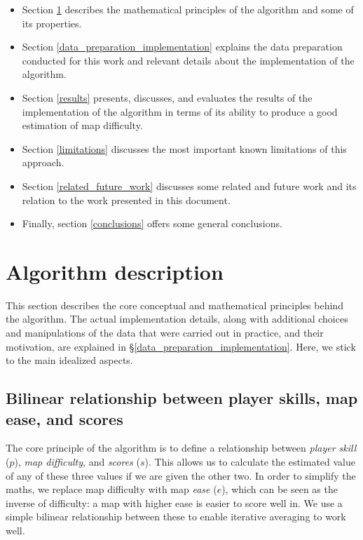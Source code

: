 \documentclass[12pt,a4paper]{article}
\begin{document}
\begin{itemize}

\item Section \ref{algorithm_description} describes the mathematical principles of the algorithm and some of its properties.
\item Section \ref{data_preparation_implementation} explains the data preparation conducted for this work and relevant details about the implementation of the algorithm.
\item Section \ref{results} presents, discusses, and evaluates the results of the implementation of the algorithm in terms of its ability to produce a good estimation of map difficulty.
\item Section \ref{limitations} discusses the most important known limitations of this approach.
\item Section \ref{related_future_work} discusses some related and future work and its relation to the work presented in this document.
\item Finally, section \ref{conclusions} offers some general conclusions.

\end{itemize}

\section{Algorithm description}
\label{algorithm_description}

This section describes the core conceptual and mathematical principles behind the algorithm. The actual implementation details, along with additional choices and manipulations of the data that were carried out in practice, and their motivation, are explained in \S \ref{data_preparation_implementation}. Here, we stick to the main idealized aspects.\\

\subsection{Bilinear relationship between player skills, map ease, and scores}

The core principle of the algorithm is to define a relationship between {\emph{player skill}} ($p$), {\emph{map difficulty}}, and {\emph{scores}} ($s$). This allows us to calculate the estimated value of any of these three values if we are given the other two. In order to simplify the maths, we replace map difficulty with map {\emph{ease}} ($e$), which can be seen as the inverse of difficulty: a map with higher ease is easier to score well in. We use a simple bilinear relationship between these to enable iterative averaging to work well.\\
\end{document}
